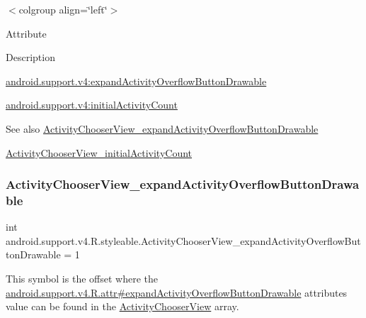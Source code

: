 \tabulinesep=1mm
\begin{longtabu} spread 0pt [c]{*{0}{|X[-1]}|}
\hline
\end{longtabu}
$<$colgroup align=\char`\"{}left\char`\"{}$>$ 

Attribute

Description 

{\ttfamily \hyperlink{classandroid_1_1support_1_1v4_1_1R_1_1styleable_a2eaae469c371865645bb2a33c1facfd5}{android.\+support.\+v4\+:expand\+Activity\+Overflow\+Button\+Drawable}}

{\ttfamily \hyperlink{classandroid_1_1support_1_1v4_1_1R_1_1styleable_aa1a6488e82c41cad0b358240a62bd4bc}{android.\+support.\+v4\+:initial\+Activity\+Count}}

\begin{DoxySeeAlso}{See also}
\hyperlink{classandroid_1_1support_1_1v4_1_1R_1_1styleable_a2eaae469c371865645bb2a33c1facfd5}{Activity\+Chooser\+View\+\_\+expand\+Activity\+Overflow\+Button\+Drawable} 

\hyperlink{classandroid_1_1support_1_1v4_1_1R_1_1styleable_aa1a6488e82c41cad0b358240a62bd4bc}{Activity\+Chooser\+View\+\_\+initial\+Activity\+Count} 
\end{DoxySeeAlso}
\mbox{\label{classandroid_1_1support_1_1v4_1_1R_1_1styleable_a2eaae469c371865645bb2a33c1facfd5}} 
\subsubsection{\texorpdfstring{Activity\+Chooser\+View\+\_\+expand\+Activity\+Overflow\+Button\+Drawable}{ActivityChooserView\_expandActivityOverflowButtonDrawable}}
{\footnotesize\ttfamily int android.\+support.\+v4.\+R.\+styleable.\+Activity\+Chooser\+View\+\_\+expand\+Activity\+Overflow\+Button\+Drawable = 1\hspace{0.3cm}{\ttfamily [static]}}

This symbol is the offset where the \hyperlink{classandroid_1_1support_1_1v4_1_1R_1_1attr_a6ce1e5650d7bdbaf6f02bb9f1c21ac55}{android.\+support.\+v4.\+R.\+attr\#expand\+Activity\+Overflow\+Button\+Drawable} attribute\textquotesingle{}s value can be found in the \hyperlink{classandroid_1_1support_1_1v4_1_1R_1_1styleable_ab8c1a7f930b02f15ae84e9f2d388782a}{Activity\+Chooser\+View} array.

